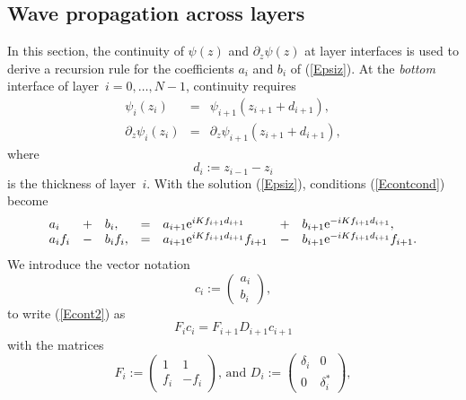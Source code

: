 \subsection{Wave propagation across layers}

In this section,
the continuity of $\psi(z)$ and $\partial_z\psi(z)$ at layer interfaces
is used to derive a recursion rule
for the coefficients $a_i$ and $b_i$ of (\ref{Epsiz}).
At the \textit{bottom} interface of layer~$i=0,\ldots,N-1$,
continuity requires
\begin{equation}\label{Econtcond}
  \begin{array}{lcl}
            \psi_{i}(z_i)&=&\psi_{i+1}(z_{i+1}+d_{i+1}),\\
            \partial_z\psi_{i}(z_i)&=&\partial_z\psi_{i+1}(z_{i+1}+d_{i+1}),
  \end{array}
\end{equation}
  where
\begin{equation}
  d_i:=z_{i-1}-z_{i}
\end{equation}
is the thickness of layer~$i$.
With the solution (\ref{Epsiz}), conditions (\ref{Econtcond}) become
\begin{equation}\label{Econt2}
  \begin{array}{lclclcl}
  a_i &+& b_i,
  &=&
  a_{i+1}\text{e}^{iKf_{i+1}d_{i+1}} &+& b_{i+1}\text{e}^{-iKf_{i+1}d_{i+1}},
  \\
  a_i f_i  &-& b_i f_i,
  &=&
 a_{i+1}\text{e}^{iKf_{i+1}d_{i+1}} f_{i+1} &-& b_{i+1}\text{e}^{-iKf_{i+1}d_{i+1}} f_{i+1}.
  \end{array}
\end{equation}
We introduce the vector notation
\begin{equation}\label{Evecc}
  c_i := \left( \begin{array}{c}a_i\\b_i\end{array} \right),
\end{equation}
to write (\ref{Econt2}) as
\begin{equation}\label{EFcFDc}
  F_i c_i = F_{i+1} D_{i+1} c_{i+1}
\end{equation}
with the matrices
\begin{equation}
  F_i := \left(\begin{array}{cc}1&1\\f_i&-f_i\end{array}\right)\text{, and }
  D_i := \left(\begin{array}{cc}\delta_i&0\\0&\delta_i^*\end{array}\right),
\end{equation}
